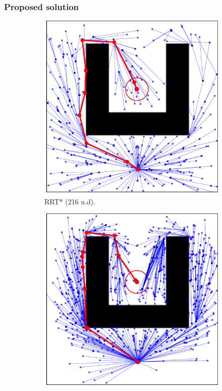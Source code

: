 \documentclass{beamer}
\begin{document}
\begin{frame}
	\frametitle{Proposed solution}	
	\begin{figure}[!ht]
		\centering 
		\begin{subfigure}[b]{0.45\textwidth}
			\includegraphics[width=\textwidth]{figChap4/RRTstar_maze216.0.pdf}
			\caption{RRT* (216 u.d).}
			\label{fig:rrtstar_maze}
		\end{subfigure}  
		\begin{subfigure}[b]{0.45\textwidth}
			\includegraphics[width=\textwidth]{figChap4/RRTstarML_maze206.0.pdf}

\end{subfigure}
\end{figure}
\end{frame}
\end{document}

